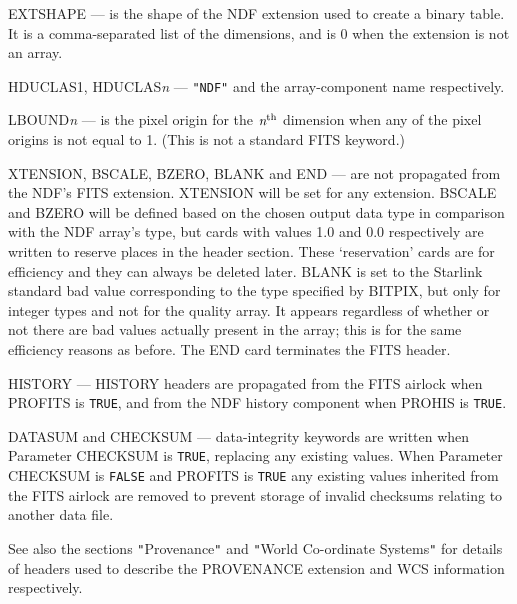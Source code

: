 \documentclass[twoside,11pt]{article}
\newcommand{\htmlref}[2]{#1}
\newcommand{\xref}[3]{#1}
\newcommand{\sstitem}{\item}
\newcommand{\sstitem}{\item}
\begin{document}
{{{{            \sstitem
            EXTSHAPE --- is the shape of the NDF extension used to
              create a binary table.  It is a comma-separated list of the
              dimensions, and is 0 when the extension is not an array.

            \sstitem
            HDUCLAS1, HDUCLAS{\em{n}} --- \texttt{"NDF"} and the
              array-component name respectively.

            \sstitem
            LBOUND{\textit{n}} --- is the pixel origin for the 
              $\textit{n}^{\rm th}$ dimension
              when any of the pixel origins is not equal to 1.  (This is not a
              standard FITS keyword.)

            \sstitem
            XTENSION, BSCALE, BZERO, BLANK and END --- are not propagated
              from the NDF's FITS extension.  XTENSION will be set for
              any extension.  BSCALE and BZERO will be defined based on
              the chosen output data type in comparison with the NDF
              array's type, but cards with values 1.0 and 0.0 respectively
              are written to reserve places in the header section.  These
              `reservation' cards are for efficiency and they can always
              be deleted later.  BLANK is set to the Starlink standard 
              \xref{bad value}{sun95}{se_badmasking} corresponding to the type
              specified by BITPIX, but only for integer types and not for the
              quality array.  It appears regardless of whether or not there are
              bad values actually present in the array; this is for the same
              efficiency reasons as before.  The END card terminates the FITS header.

            \sstitem
            HISTORY --- HISTORY headers are propagated from the FITS
              airlock when PROFITS is \texttt{TRUE}, and from the NDF
              history component when PROHIS is \texttt{TRUE}.

            \sstitem
            DATASUM and CHECKSUM --- data-integrity keywords are written 
            when Parameter CHECKSUM is \texttt{TRUE}, replacing any existing
            values.  When Parameter CHECKSUM is \texttt{FALSE} and PROFITS is
            \texttt{TRUE} any existing values inherited from the FITS airlock are 
            removed to prevent storage of invalid checksums relating to 
            another data file.

         }
         See also the sections
         \htmlref{\texttt{"}Provenance\texttt{"}}{ndf2fits_provenance} and
         \htmlref{\texttt{"}World Co-ordinate Systems\texttt{"}}{world_coordinate_systems}
         for details of headers used to describe the PROVENANCE extension 
         and WCS information respectively.

}}}
\end{document}
